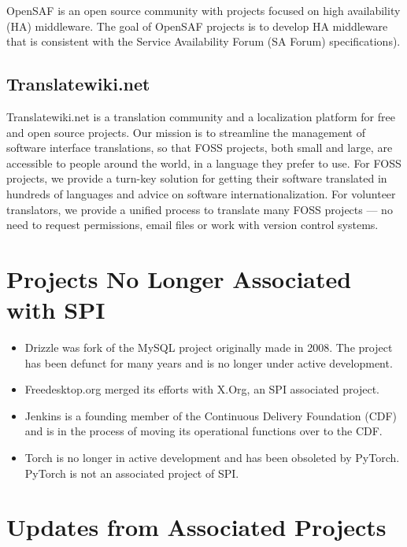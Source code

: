 \documentclass[a4paper]{report}
\begin{document}
OpenSAF is an open source community with projects focused on high
availability (HA) middleware.  The goal of OpenSAF projects is to
develop HA middleware that is consistent with the Service Availability
Forum (SA Forum) specifications).

\subsection{Translatewiki.net}

Translatewiki.net is a translation community and a localization platform
for free and open source projects. Our mission is to streamline the
management of software interface translations, so that FOSS projects,
both small and large, are accessible to people around the world, in a
language they prefer to use. For FOSS projects, we provide a turn-key
solution for getting their software translated in hundreds of languages
and advice on software internationalization. For volunteer translators,
we provide a unified process to translate many FOSS projects ---  no
need to request permissions, email files or work with version control
systems.

\section{Projects No Longer Associated with SPI}

\begin{itemize}

\item Drizzle was fork of the MySQL project originally made in 2008.
The project has been defunct for many years and is no longer under
active development.

\item Freedesktop.org merged its efforts with X.Org, an SPI associated
project.

\item Jenkins is a founding member of the Continuous Delivery Foundation
(CDF) and is in the process of moving its operational functions over to
the CDF.

\item Torch is no longer in active development and has been obsoleted
by PyTorch.  PyTorch is not an associated project of SPI.

\end{itemize}

\section{Updates from Associated Projects}
\end{document}
